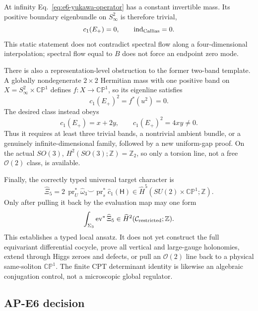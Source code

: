 \documentclass[11pt]{article}
\numberwithin{equation}{section}
\newcommand{\CP}{\mathbb{CP}}
\newcommand{\ZZ}{\mathbb Z}
\newcommand{\cO}{\mathcal O}
\newcommand{\ind}{\operatorname{ind}}
\begin{document}
At infinity Eq.~\eqref{eq:e6-yukawa-operator} has a constant invertible mass.
Its positive boundary eigenbundle on \(S^2_\infty\) is therefore trivial,
\begin{equation}
 c_1(E_+)=0,\qquad \ind_{\rm Callias}=0.
 \label{eq:e6-callias-zero}
\end{equation}
This static statement does not contradict spectral flow along a
four-dimensional interpolation; spectral flow equal to \(B\) does not force
an endpoint zero mode.

There is also a representation-level obstruction to the former two-band
template.  A globally nondegenerate \(2\times2\) Hermitian mass with one
positive band on \(X=S^2_\infty\times\CP^1\) defines
\(f:X\to\CP^1\), so its eigenline satisfies
\begin{equation}
 c_1(E_+)^2=f^*(u^2)=0.
\end{equation}
The desired class instead obeys
\begin{equation}
 c_1(E_+)=x+2y,\qquad c_1(E_+)^2=4xy\ne0.
 \label{eq:e6-two-band-obstruction}
\end{equation}
Thus it requires at least three trivial bands, a nontrivial ambient bundle,
or a genuinely infinite-dimensional family, followed by a new uniform-gap
proof.  On the actual \(SO(3)\), \(H^2(SO(3);\ZZ)=\ZZ_2\), so only a torsion
line, not a free \(\cO(2)\) class, is available.

Finally, the correctly typed universal target character is
\begin{equation}
 \widehat\Xi_5
 =2\,\operatorname{pr}_U^*\widehat\omega_3
 \smile\operatorname{pr}_s^*\widehat c_1(\mathsf H)
 \in\widehat H^5(SU(2)\times\CP^1;\ZZ).
 \label{eq:e6-universal-character}
\end{equation}
Only after pulling it back by the evaluation map may one form
\begin{equation}
 \int_{\Sigma_3}\operatorname{ev}^*\widehat\Xi_5
 \in\widehat H^2(\mathcal C_{\rm restricted};\ZZ).
 \label{eq:e6-typed-transgression}
\end{equation}
This establishes a typed local ansatz.  It does not yet construct the full
equivariant differential cocycle, prove all vertical and large-gauge
holonomies, extend through Higgs zeroes and defects, or pull an \(\cO(2)\)
line back to a physical same-soliton \(\CP^1\).  The finite CPT determinant
identity is likewise an algebraic conjugation control, not a microscopic
global regulator.

\subsection{AP-E6 decision}
\end{document}
